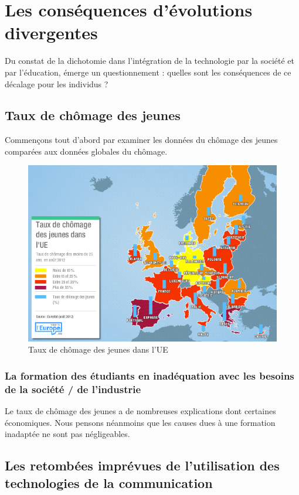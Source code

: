 
\chapter{Les conséquences d'évolutions divergentes}
Du constat de la dichotomie dans l'intégration de la technologie par la société et par l'éducation, émerge un questionnement : quelles sont les conséquences de ce décalage pour les individus ?


\section{Taux de chômage des jeunes}
Commençons tout d'abord par examiner les données du chômage des jeunes comparées aux données globales du chômage.
\begin{figure}[H]
\centering
\includegraphics[width=0.92\linewidth]{figures/chom_jeunes}
\caption{Taux de chômage des jeunes dans l'UE \cite{chom_jeunes}}
\end{figure}

\subsection{La formation des étudiants en inadéquation avec les besoins de la société / de l'industrie}
Le taux de chômage des jeunes a de nombreuses explications dont certaines économiques. Nous pensons néanmoins que les causes dues à une formation inadaptée ne sont pas négligeables.



\section{Les retombées imprévues de l'utilisation des technologies de la communication}

